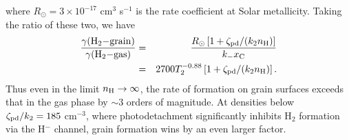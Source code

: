 \begin{enumerate}
\begin{enumerate}
where $R_{\odot} = 3\times 10^{-17}$ cm$^3$ s$^{-1}$ is the rate coefficient at Solar metallicity. Taking the ratio of these two, we have
\begin{eqnarray*}
\frac{\gamma({\rm H}_2{\rm - grain})}{\gamma({\rm H}_2{\rm - gas})} & = & \frac{R_{\odot} \left[1+ \zeta_{\rm pd}/(k_2 n_{\rm H})\right]}{k_{-} x_{\rm C}} \\
& = & 2700 T_2^{-0.88} \left[1+ \zeta_{\rm pd}/(k_2 n_{\rm H})\right].
\end{eqnarray*}
Thus even in the limit $n_{\rm H} \rightarrow \infty$, the rate of formation on grain surfaces exceeds that in the gas phase by $\sim 3$ orders of magnitude. At densities below $\zeta_{\rm pd}/k_2 = 185$ cm$^{-3}$, where photodetachment significantly inhibits H$_2$ formation via the H$^-$ channel, grain formation wins by an even larger factor.\\


\end{enumerate}
\end{enumerate}
